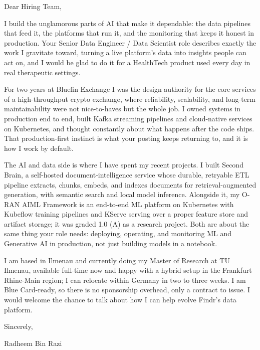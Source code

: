 \documentclass[11pt,a4paper]{coverletter}
\begin{document}

\opening{Dear Hiring Team,}

I build the unglamorous parts of AI that make it dependable: the data pipelines that feed it, the platforms that run it, and the monitoring that keeps it honest in production. Your Senior Data Engineer / Data Scientist role describes exactly the work I gravitate toward, turning a live platform's data into insights people can act on, and I would be glad to do it for a HealthTech product used every day in real therapeutic settings.

For two years at Bluefin Exchange I was the design authority for the core services of a high-throughput crypto exchange, where reliability, scalability, and long-term maintainability were not nice-to-haves but the whole job. I owned systems in production end to end, built Kafka streaming pipelines and cloud-native services on Kubernetes, and thought constantly about what happens after the code ships. That production-first instinct is what your posting keeps returning to, and it is how I work by default.

The AI and data side is where I have spent my recent projects. I built Second Brain, a self-hosted document-intelligence service whose durable, retryable ETL pipeline extracts, chunks, embeds, and indexes documents for retrieval-augmented generation, with semantic search and local model inference. Alongside it, my O-RAN AIML Framework is an end-to-end ML platform on Kubernetes with Kubeflow training pipelines and KServe serving over a proper feature store and artifact storage; it was graded 1.0 (A) as a research project. Both are about the same thing your role needs: deploying, operating, and monitoring ML and Generative AI in production, not just building models in a notebook.

I am based in Ilmenau and currently doing my Master of Research at TU Ilmenau, available full-time now and happy with a hybrid setup in the Frankfurt Rhine-Main region; I can relocate within Germany in two to three weeks. I am Blue Card-ready, so there is no sponsorship overhead, only a contract to issue. I would welcome the chance to talk about how I can help evolve Findr's data platform.

\closing{Sincerely,}{Radheem Bin Razi}

\clearpage
{}

\end{document}
